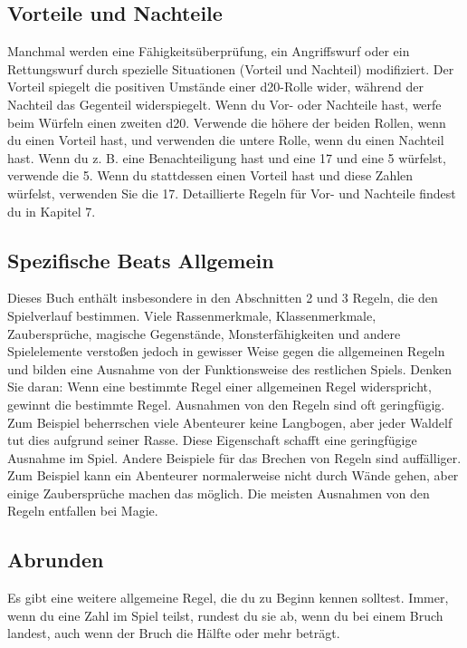 \subsection{Vorteile und Nachteile}

Manchmal werden eine Fähigkeitsüberprüfung, ein Angriffswurf oder ein Rettungswurf durch spezielle Situationen (Vorteil und Nachteil) modifiziert. Der Vorteil spiegelt die positiven Umstände einer d20-Rolle wider, während der Nachteil das Gegenteil widerspiegelt. Wenn du Vor- oder Nachteile hast, werfe beim Würfeln einen zweiten d20. Verwende die höhere der beiden Rollen, wenn du einen Vorteil hast, und verwenden die untere Rolle, wenn du einen Nachteil hast. Wenn du z. B. eine Benachteiligung hast und eine 17 und eine 5 würfelst, verwende die 5. Wenn du stattdessen einen Vorteil hast und diese Zahlen würfelst, verwenden Sie die 17. Detaillierte Regeln für Vor- und Nachteile findest du in Kapitel 7.

\subsection{Spezifische Beats Allgemein}
Dieses Buch enthält insbesondere in den Abschnitten 2 und 3 Regeln, die den Spielverlauf bestimmen. Viele Rassenmerkmale, Klassenmerkmale, Zaubersprüche, magische Gegenstände, Monsterfähigkeiten und andere Spielelemente verstoßen jedoch in gewisser Weise gegen die allgemeinen Regeln und bilden eine Ausnahme von der Funktionsweise des restlichen Spiels. Denken Sie daran: Wenn eine bestimmte Regel einer allgemeinen Regel widerspricht, gewinnt die bestimmte Regel. Ausnahmen von den Regeln sind oft geringfügig. Zum Beispiel beherrschen viele Abenteurer keine Langbogen, aber jeder Waldelf tut dies aufgrund seiner Rasse. Diese Eigenschaft schafft eine geringfügige Ausnahme im Spiel. Andere Beispiele für das Brechen von Regeln sind auffälliger. Zum Beispiel kann ein Abenteurer normalerweise nicht durch Wände gehen, aber einige Zaubersprüche machen das möglich. Die meisten Ausnahmen von den Regeln entfallen bei Magie.
\subsection{Abrunden}
Es gibt eine weitere allgemeine Regel, die du zu Beginn kennen solltest. Immer, wenn du eine Zahl im Spiel teilst, rundest du sie ab, wenn du bei einem Bruch landest, auch wenn der Bruch die Hälfte oder mehr beträgt.
